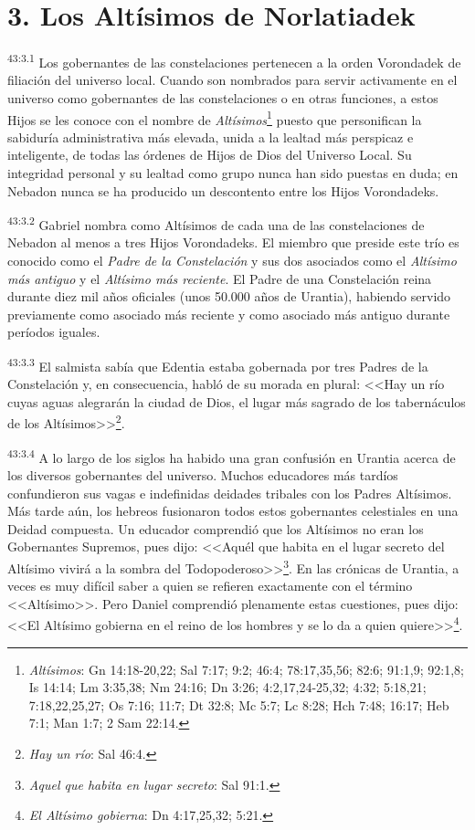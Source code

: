 \section*{3. Los Altísimos de Norlatiadek}
\par
\textsuperscript{43:3.1} Los gobernantes de las constelaciones pertenecen a la orden Vorondadek de filiación del universo local. Cuando son nombrados para servir activamente en el universo como gobernantes de las constelaciones o en otras funciones, a estos Hijos se les conoce con el nombre de \textit{Altísimos}\footnote{\textit{Altísimos}: Gn 14:18-20,22; Sal 7:17; 9:2; 46:4; 78:17,35,56; 82:6; 91:1,9; 92:1,8; Is 14:14; Lm 3:35,38; Nm 24:16; Dn 3:26; 4:2,17,24-25,32; 4:32; 5:18,21; 7:18,22,25,27; Os 7:16; 11:7; Dt 32:8; Mc 5:7; Lc 8:28; Hch 7:48; 16:17; Heb 7:1; Man 1:7; 2 Sam 22:14.} puesto que personifican la sabiduría administrativa más elevada, unida a la lealtad más perspicaz e inteligente, de todas las órdenes de Hijos de Dios del Universo Local. Su integridad personal y su lealtad como grupo nunca han sido puestas en duda; en Nebadon nunca se ha producido un descontento entre los Hijos Vorondadeks.

\par
\textsuperscript{43:3.2} Gabriel nombra como Altísimos de cada una de las constelaciones de Nebadon al menos a tres Hijos Vorondadeks. El miembro que preside este trío es conocido como el \textit{Padre de la Constelación} y sus dos asociados como el \textit{Altísimo más antiguo} y el \textit{Altísimo más reciente}. El Padre de una Constelación reina durante diez mil años oficiales (unos 50.000 años de Urantia), habiendo servido previamente como asociado más reciente y como asociado más antiguo durante períodos iguales.

\par
\textsuperscript{43:3.3} El salmista sabía que Edentia estaba gobernada por tres Padres de la Constelación y, en consecuencia, habló de su morada en plural: <<Hay un río cuyas aguas alegrarán la ciudad de Dios, el lugar más sagrado de los tabernáculos de los Altísimos>>\footnote{\textit{Hay un río}: Sal 46:4.}.

\par
\textsuperscript{43:3.4} A lo largo de los siglos ha habido una gran confusión en Urantia acerca de los diversos gobernantes del universo. Muchos educadores más tardíos confundieron sus vagas e indefinidas deidades tribales con los Padres Altísimos. Más tarde aún, los hebreos fusionaron todos estos gobernantes celestiales en una Deidad compuesta. Un educador comprendió que los Altísimos no eran los Gobernantes Supremos, pues dijo: <<Aquél que habita en el lugar secreto del Altísimo vivirá a la sombra del Todopoderoso>>\footnote{\textit{Aquel que habita en lugar secreto}: Sal 91:1.}. En las crónicas de Urantia, a veces es muy difícil saber a quien se refieren exactamente con el término <<Altísimo>>. Pero Daniel comprendió plenamente estas cuestiones, pues dijo: <<El Altísimo gobierna en el reino de los hombres y se lo da a quien quiere>>\footnote{\textit{El Altísimo gobierna}: Dn 4:17,25,32; 5:21.}.

